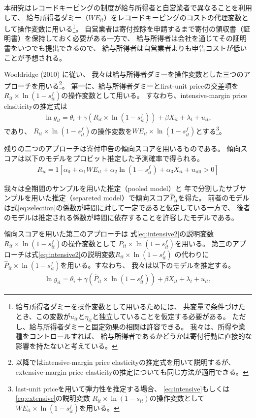 \documentclass[
  11pt,
  a4paper,
]{article}
\begin{document}
本研究はレコードキーピングの制度が給与所得者と自営業者で異なることを利用して、
給与所得者ダミー（\(WE_{it}\)）をレコードキーピングのコストの代理変数として操作変数に用いる\footnote{給与所得者ダミーを操作変数として用いるためには、
  共変量で条件づけたとき、この変数が\(u_{it}\)と\(\eta_{it}\)と独立していることを仮定する必要がある。
  ただし、給与所得者ダミーと固定効果の相関は許容できる。
  我々は、所得や業種をコントロールすれば、
  給与所得者であるかどうかは寄付行動に直接的な影響を持たないと考えている。}。
自営業者は寄付控除を申請するまで寄付の領収書（証明書）を保持しておく必要がある一方で、
給与所得者は会社を通じてその証明書をいつでも提出できるので、
給与所得者は自営業者よりも申告コストが低いことが予想される。

Wooldridge (2010) に従い、
我々は給与所得者ダミーを操作変数とした三つのアプローチを用いる\footnote{以降ではintensive-margin price elasticityの推定式を用いて説明するが、
  extensive-margin price elasticityの推定についても同じ方法が適用できる。}。
第一に、給与所得者ダミーとfirst-unit priceの交差項を
\(R_{it} \times \ln (1 - s^f_{it})\)の操作変数として用いる。
すなわち、intensive-margin price elasiticityの推定式は
\begin{align}
  \ln g_{it} = \theta_i + \gamma (R_{it} \times \ln (1 - s^f_{it}))
    + \beta X_{it} + \lambda_t + u_{it}, \label{eq:intensive2}
\end{align}
であり、
\(R_{it} \times \ln (1 - s^f_{it})\)の操作変数を\(WE_{it} \times \ln(1 - s^f_{it})\)とする\footnote{last-unit priceを用いて弾力性を推定する場合、
  \eqref{eq:intensive}もしくは\eqref{eq:extensive}の説明変数
  \(R_{it} \times \ln (1 - s_{it})\)の操作変数として
  \(WE_{it} \times \ln(1 - s^f_{it})\)を用いる。}。

残りの二つのアプローチは寄付申告の傾向スコアを用いるものである。
傾向スコアは以下のモデルをプロビット推定した予測確率で得られる。
\begin{align}
  R_{it} = 1[
    \alpha_0 + \alpha_1 WE_{it} + \alpha_2 \ln(1 - s^f_{it})
    + \alpha_3 X_{it} + u_{it0} > 0
  ] \label{eq:selection}
\end{align}

我々は全期間のサンプルを用いた推定（pooled model）と
年で分割したサブサンプルを用いた推定（separeted model）で傾向スコア\(\hat{P}_{it}\)を得た。
前者のモデルは式\eqref{eq:selection}の係数が時間に対して一定であると仮定している一方で、
後者のモデルは推定される係数が時間に依存することを許容したモデルである。

傾向スコアを用いた第二のアプローチは
式\eqref{eq:intensive2}の説明変数\(R_{it} \times \ln (1 - s^f_{it})\)の操作変数として
\(\hat{P}_{it} \times \ln (1 - s^f_{it})\)を用いる。
第三のアプローチは式\eqref{eq:intensive2}の説明変数\(R_{it} \times \ln (1 - s^f_{it})\)
の代わりに\(\hat{P}_{it} \times \ln (1 - s^f_{it})\)を用いる。すなわち、
我々は以下のモデルを推定する。
\begin{align}
  \ln g_{it} = \theta_i + \gamma (\hat{P}_{it} \times \ln (1 - s^f_{it}))
    + \beta X_{it} + \lambda_t + u_{it}, \label{eq:intensive3}
\end{align}
\end{document}
